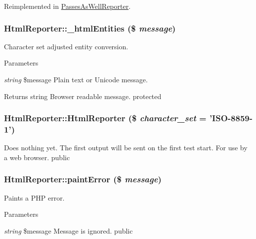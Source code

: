 Reimplemented in \hyperlink{class_passes_as_well_reporter_a8f5c1e45938a73ffd2f910820b2b14ca}{PassesAsWellReporter}.\hypertarget{class_html_reporter_aac72f7e2d9ed9e802ebd7ef1eca8e3c7}{
\subsubsection[{\_\-htmlEntities}]{\setlength{\rightskip}{0pt plus 5cm}HtmlReporter::\_\-htmlEntities (\$ {\em message})}}
\label{class_html_reporter_aac72f7e2d9ed9e802ebd7ef1eca8e3c7}
Character set adjusted entity conversion. 
\begin{DoxyParams}{Parameters}
\item[{\em string}]\$message Plain text or Unicode message. \end{DoxyParams}
\begin{DoxyReturn}{Returns}
string Browser readable message.  protected 
\end{DoxyReturn}
\hypertarget{class_html_reporter_ad515762c037bcb2b06d8dcf347ab1d40}{
\subsubsection[{HtmlReporter}]{\setlength{\rightskip}{0pt plus 5cm}HtmlReporter::HtmlReporter (\$ {\em character\_\-set} = {\ttfamily 'ISO-\/8859-\/1'})}}
\label{class_html_reporter_ad515762c037bcb2b06d8dcf347ab1d40}
Does nothing yet. The first output will be sent on the first test start. For use by a web browser.  public \hypertarget{class_html_reporter_af6c7e574ee27fa12c6c9299aa6939727}{
\subsubsection[{paintError}]{\setlength{\rightskip}{0pt plus 5cm}HtmlReporter::paintError (\$ {\em message})}}
\label{class_html_reporter_af6c7e574ee27fa12c6c9299aa6939727}
Paints a PHP error. 
\begin{DoxyParams}{Parameters}
\item[{\em string}]\$message Message is ignored.  public \end{DoxyParams}


